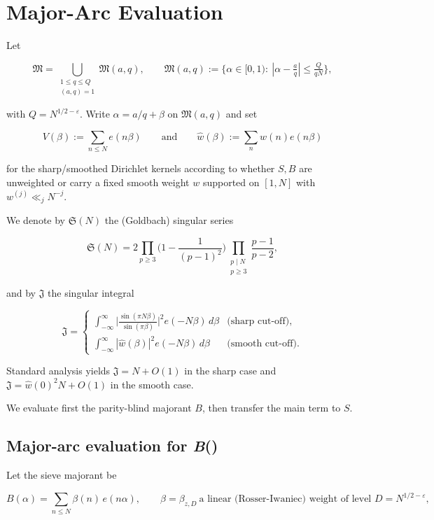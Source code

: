 \documentclass[11pt]{article}
\theoremstyle{definition}
\theoremstyle{remark}
\numberwithin{equation}{part}
\begin{document}
\section{Major-Arc Evaluation}

Let

$$
	\mathfrak M=\bigcup_{\substack{1\le q\le Q\\(a,q)=1}}\mathfrak M(a,q),\qquad
	\mathfrak M(a,q):=\{\alpha\in[0,1):\ |\alpha-\tfrac aq|\le \tfrac{Q}{qN}\},
$$

with $Q=N^{1/2-\varepsilon}$. Write $\alpha=a/q+\beta$ on $\mathfrak M(a,q)$ and set

$$
	V(\beta):=\sum_{n\le N}e(n\beta) \qquad\text{and}\qquad \widehat w(\beta):=\sum_{n}w(n)e(n\beta)
$$

for the sharp/smoothed Dirichlet kernels according to whether $S, B$ are unweighted or carry a fixed smooth weight $w$ supported on $[1,N]$ with $w^{(j)}\ll_j N^{-j}$.

We denote by $\mathfrak S(N)$ the (Goldbach) singular series

$$
	\mathfrak S(N)=2\prod_{p\ge 3}\Big(1-\frac1{(p-1)^2}\Big)
	\prod_{\substack{p\mid N\\ p\ge 3}}\frac{p-1}{p-2},
$$

and by $\mathfrak J$ the singular integral

$$
	\mathfrak J=
	\begin{cases}
		\displaystyle \int_{-\infty}^{\infty}\Big|\frac{\sin(\pi N\beta)}{\sin(\pi\beta)}\Big|^{\!2}e(-N\beta)\,d\beta
		 & \text{(sharp cut-off)},  \\[2ex]
		\displaystyle \int_{-\infty}^{\infty}|\widehat w(\beta)|^{2}e(-N\beta)\,d\beta
		 & \text{(smooth cut-off)}.
	\end{cases}
$$

Standard analysis yields $\mathfrak J=N+O(1)$ in the sharp case and $\mathfrak J=\widehat w(0)^2 N+O(1)$ in the smooth case.

We evaluate first the parity-blind majorant $B$, then transfer the main term to $S$.

\subsection{Major-arc evaluation for \textit{B}(\textalpha)}

Let the sieve majorant be

$$
	B(\alpha)=\sum_{n\le N}\beta(n)\,e(n\alpha),\qquad
	\beta=\beta_{z,D}\ \text{a linear (Rosser-Iwaniec) weight of level }D=N^{1/2-\varepsilon},
$$
\end{document}
